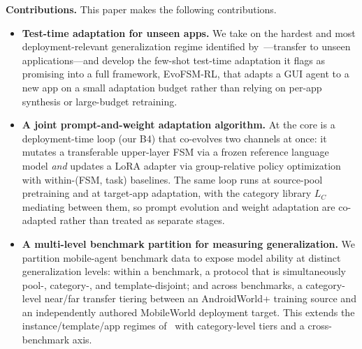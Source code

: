 \medskip
\noindent\textbf{Contributions.} This paper makes the following contributions.
\begin{itemize}
    \item \textbf{Test-time adaptation for unseen apps.} We take on the hardest
    and most deployment-relevant generalization regime identified
    by~\citet{gu2026generalization}---transfer to unseen applications---and
    develop the few-shot test-time adaptation it flags as promising into a full
    framework, EvoFSM-RL, that adapts a GUI agent to a new app on a small
    adaptation budget rather than relying on per-app synthesis or large-budget
    retraining.

    \item \textbf{A joint prompt-and-weight adaptation algorithm.} At the core is
    a deployment-time loop (our B4) that co-evolves two channels at once: it
    mutates a transferable upper-layer FSM via a frozen reference language model
    \emph{and} updates a LoRA adapter via group-relative policy optimization with
    within-(FSM, task) baselines. The same loop runs at source-pool pretraining
    and at target-app adaptation, with the category library $L_C$ mediating
    between them, so prompt evolution and weight adaptation are co-adapted rather
    than treated as separate stages.

    \item \textbf{A multi-level benchmark partition for measuring
    generalization.} We partition mobile-agent benchmark data to expose model
    ability at distinct generalization levels: within a benchmark, a protocol
    that is simultaneously pool-, category-, and template-disjoint; and across
    benchmarks, a category-level near/far transfer tiering between an
    AndroidWorld+ training source and an independently authored MobileWorld
    deployment target. This extends the instance/template/app regimes
    of~\citet{gu2026generalization} with category-level tiers and a
    cross-benchmark axis.
\end{itemize}
